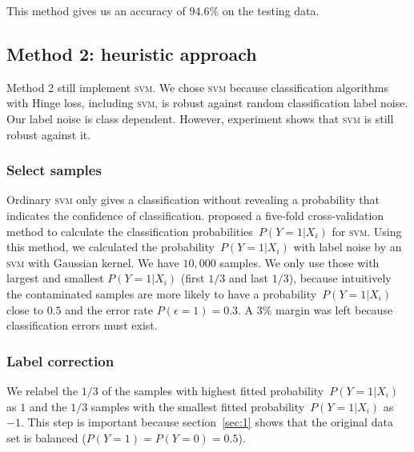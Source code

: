 \documentclass{article} %
\begin{document}



This method gives us an accuracy of $94.6\%$ on the testing data.

\subsection{Method 2: heuristic approach}\label{2nd}
Method 2 still implement \textsc{svm}. We chose \textsc{svm} because classification algorithms with Hinge loss, including \textsc{svm}, is robust against random classification label noise. Our label noise is class dependent. However, experiment shows that \textsc{svm} is still robust against it.

\subsubsection{Select samples}
Ordinary \textsc{svm} only gives a classification without revealing a probability that indicates the confidence of classification. \citet{Wu03probabilityestimates} proposed a five-fold cross-validation method to calculate the classification probabilities~$P(Y=1|X_i)$ for \textsc{svm}. 
Using this method, we calculated the probability~$P(Y=1|X_i)$ with label noise by an \textsc{svm} with Gaussian kernel. We have $10,000$ samples. We only use those with largest and smallest $P(Y=1|X_i)$ (first $1/3$ and last $1/3$), because intuitively the contaminated samples are more likely to have a probability~$P(Y=1|X_i)$ close to $0.5$ and the error rate $P(\epsilon=1)=0.3$. A $3\%$ margin was left because classification errors must exist.
\subsubsection{Label correction}
We relabel the $1/3$ of the samples with highest fitted probability~$P(Y=1|X_i)$ as $1$ and the $1/3$ samples with the smallest fitted probability~$P(Y=1|X_i)$ as $-1$. This step is important because section~\ref{sec:1} shows that the original data set is balanced ($P(Y=1)=P(Y=0)=0.5$). 
\end{document}
